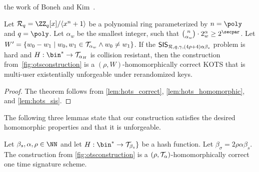  the work of Boneh and Kim~\cite{BonKim2020}. 
\begin{theorem}
Let $\ring_q=\ZZ_q[x]/\langle x^n+1\rangle$ be a polynomial ring parameterized by $n=\poly$ and $q=\poly$.  
Let $\alpha_w$ be the smallest integer, such that $\binom{n}{\alpha_w}\cdot 2^\alpha_w \geq 2^\secpar$.
Let $W' = \{w_0-w_1\mid w_0,w_1\in\mathcal{T}_{\alpha_w} \land w_0\neq w_1\}$.
If the  $\mathsf{SIS}_{\mathcal{R},q,\gamma,(4\rho + 4)\alpha\beta_s}$ problem is hard and $H : \bin^* \to \tern_{\alpha_H}$ is collision resistant, then the construction from~\autoref{fig:otsconstruction} is a $(\rho,W)$-homomorphically correct KOTS that is multi-user existentially unforgeable under rerandomized keys.
\end{theorem}
\begin{proof}
The theorem follows from \autoref{lem:hots_correct}, \autoref{lem:hots_homomorphic}, and \autoref{lem:hots_sis}.
\end{proof}

The following three lemmas state that our construction satisfies the desired homomorphic properties and that it is unforgeable.

\begin{lemma}\label{lem:hots_correct}
  Let $\beta_s,\alpha,\rho\in\NN$ and let $H : \bin^* \to \tern_{\beta_s}\}$ be a hash function.
  Let $\beta_\sigma = 2\rho\alpha\beta_s$.
  The construction from \autoref{fig:otsconstruction} is a $(\rho,\mathcal{T}_\alpha)$-homomorphically correct one time signature scheme.
\end{lemma}

